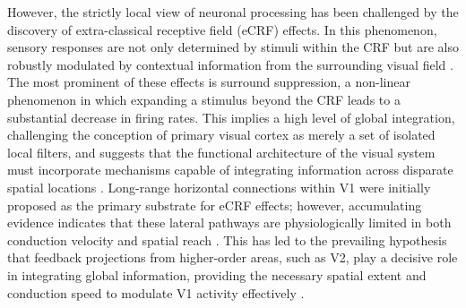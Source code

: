 However, the strictly local view of neuronal processing has been challenged by the discovery of extra-classical receptive field (eCRF) effects. In this phenomenon, sensory responses are not only determined by stimuli within the CRF but are also robustly modulated by contextual information from the surrounding visual field \citep{Allman1985}. The most prominent of these effects is surround suppression, a non-linear phenomenon in which expanding a stimulus beyond the CRF leads to a substantial decrease in firing rates. This implies a high level of global integration, challenging the conception of primary visual cortex as merely a set of isolated local filters, and suggests that the functional architecture of the visual system must incorporate mechanisms capable of integrating information across disparate spatial locations \citep{Angelucci2003}. Long-range horizontal connections within V1 were initially proposed as the primary substrate for eCRF effects; however, accumulating evidence indicates that these lateral pathways are physiologically limited in both conduction velocity and spatial reach \citep{Bair2003,Schwabe2006}. This has led to the prevailing hypothesis that feedback projections from higher-order areas, such as V2, play a decisive role in integrating global information, providing the necessary spatial extent and conduction speed to modulate V1 activity effectively \citep{Angelucci2017}.

